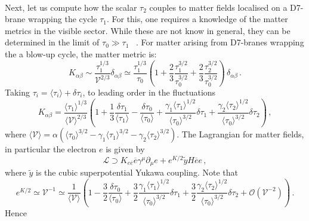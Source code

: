 \documentclass[11pt,a4paper]{article}
\newcommand{\V}{\mathcal{V}}
\begin{document}
\\
Next, let us compute how the scalar $\tau_2$ couples to matter fields localised on a D7-brane wrapping the cycle $\tau_1$. For this, one requires a knowledge of the matter metrics in the visible sector. While these are not know in general, they can be determined in the limit of $\tau_0 \gg \tau_1$ ~\cite{Conlon:2006tj, Aparicio:2008wh, Aparicio:2015psl}. For matter arising from D7-branes wrapping the a blow-up cycle, the matter metric is:
%
\begin{equation}
K_{\alpha \beta} \sim \frac{\tau_1^{1/3}}{\V^{2/3}} \delta_{\alpha \beta} \simeq \frac{\tau_1^{1/3}}{\tau_0} \left(1 + \frac{2}{3} \frac{\tau_1^{3/2}}{\tau_0^{3/2}} + \frac{2}{3} \frac{\tau_2^{3/2}}{\tau_0^{3/2}}\right) \, \delta_{\alpha \beta} \,.
\end{equation}
%
Taking $\tau_i = \langle \tau_i \rangle + \delta \tau_i$, to leading order in the fluctuations
%
\begin{equation}
\label{matmet}
K_{\alpha \beta} = \frac{\langle \tau_1 \rangle^{1/3}}{\langle \V \rangle^{2/3}} \left(1 + \frac{1}{3} \frac{\delta \tau_1}{\langle \tau_1 \rangle} - \frac{\delta \tau_0}{\langle \tau_0 \rangle} + \frac{\gamma_1 \langle \tau_1 \rangle^{1/2}}{\langle \tau_0 \rangle^{3/2}} \delta \tau_1 + \frac{\gamma_2 \langle \tau_2 \rangle^{1/2}}{\langle \tau_0 \rangle^{3/2}} \delta \tau_2\right) \,,
\end{equation}
where $\langle \V \rangle = \alpha\left(\langle\tau_0\rangle^{3/2} - \gamma_1 \langle\tau_1\rangle^{3/2} - \gamma_2 \langle\tau_2\rangle^{3/2}\right)$.  The Lagrangian for matter fields, in particular the electron $e$ is given by
%
\begin{equation}
\mathcal{L} \supset K_{e \overline{e}} \overline{e} \gamma^\mu \partial_\mu e +  e^{K/2} \tilde{y} H \overline{e} e \,,
\end{equation}
%
where $\tilde{y}$ is the cubic superpotential Yukawa coupling. Note that
\begin{equation}
e^{K/2} \simeq  \V^{-1} \simeq \frac{1}{\langle \V \rangle} \left(1 - \frac{3}{2} \frac{\delta \tau_0}{\langle \tau_0 \rangle} + \frac{3}{2} \frac{\gamma_1 \langle \tau_1 \rangle^{1/2}}{\langle \tau_0 \rangle^{3/2}} \delta \tau_1 +  \frac{3}{2} \frac{ \gamma_2 \langle \tau_2 \rangle^{1/2}}{\langle \tau_0 \rangle^{3/2}} \delta \tau_2 + \mathcal{O}\left(\V^{-2}\right)\right) \,.
\end{equation}
Hence
\end{document}
